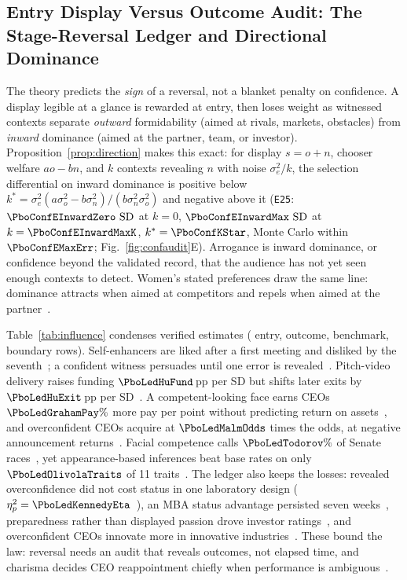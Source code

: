 \subsection{Entry Display Versus Outcome Audit: The Stage-Reversal Ledger and Directional Dominance}
The theory predicts the \emph{sign} of a reversal, not a blanket penalty on confidence. A display legible at a glance is rewarded at entry, then loses weight as witnessed contexts separate \emph{outward} formidability (aimed at rivals, markets, obstacles) from \emph{inward} dominance (aimed at the partner, team, or investor). Proposition~\ref{prop:direction} makes this exact: for display $s=o+n$, chooser welfare $ao-bn$, and $k$ contexts revealing $n$ with noise $\sigma_e^2/k$, the selection differential on inward dominance is positive below $k^*=\sigma_e^2(a\sigma_o^2-b\sigma_n^2)/(b\sigma_n^2\sigma_o^2)$ and negative above it (\texttt{E25}: $\PboConfEInwardZero\,\SD$ at $k=0$, $\PboConfEInwardMax\,\SD$ at $k=\PboConfEInwardMaxK$, $k^*=\PboConfKStar$, Monte Carlo within $\PboConfEMaxErr$; Fig.~\ref{fig:confaudit}E). Arrogance is inward dominance, or confidence beyond the validated record, that the audience has not yet seen enough contexts to detect. Women's stated preferences draw the same line: dominance attracts when aimed at competitors and repels when aimed at the partner~\cite{snyder2008}.

Table~\ref{tab:influence} condenses \PboConfLedgerN{} verified estimates (\PboConfLedgerEntry{} entry, \PboConfLedgerOutcome{} outcome, \PboConfLedgerBench{} benchmark, \PboConfLedgerBoundary{} boundary rows). Self-enhancers are liked after a first meeting and disliked by the seventh~\cite{paulhus1998}; a confident witness persuades until one error is revealed~\cite{tenney2007}. Pitch-video delivery raises funding $\PboLedHuFund$\,pp per SD but shifts later exits by $\PboLedHuExit$\,pp per SD~\cite{hu2025}. A competent-looking face earns CEOs $\PboLedGrahamPay\%$ more pay per point without predicting return on assets~\cite{graham2017}, and overconfident CEOs acquire at $\PboLedMalmOdds$ times the odds, at negative announcement returns~\cite{malmendier2008}. Facial competence calls $\PboLedTodorov\%$ of Senate races~\cite{todorov2005}, yet appearance-based inferences beat base rates on only $\PboLedOlivolaTraits$ of 11 traits~\cite{olivola2010}. The ledger also keeps the losses: revealed overconfidence did not cost status in one laboratory design ($\eta_p^2=\PboLedKennedyEta$~\cite{kennedy2013}), an MBA status advantage persisted seven weeks~\cite{anderson2012}, preparedness rather than displayed passion drove investor ratings~\cite{chen2009}, and overconfident CEOs innovate more in innovative industries~\cite{hirshleifer2012}. These bound the law: reversal needs an audit that reveals outcomes, not elapsed time, and charisma decides CEO reappointment chiefly when performance is ambiguous~\cite{jacquart2015}.

